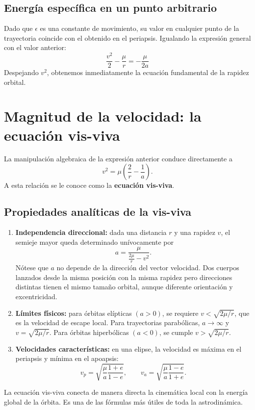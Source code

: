 \subsection{Energía específica en un punto arbitrario}
Dado que \(\epsilon\) es una constante de movimiento, su valor en cualquier punto de la trayectoria coincide con el obtenido en el periapsis. Igualando la expresión general con el valor anterior:
\[
\frac{v^2}{2} - \frac{\mu}{r} = -\frac{\mu}{2a}
\]
Despejando \(v^2\), obtenemos inmediatamente la ecuación fundamental de la rapidez orbital.

\section{Magnitud de la velocidad: la ecuación vis-viva}
La manipulación algebraica de la expresión anterior conduce directamente a
\[
 v^2 = \mu\left(\frac{2}{r} - \frac{1}{a}\right).
\]
A esta relación se le conoce como la \textbf{ecuación vis-viva}.

\subsection{Propiedades analíticas de la vis-viva}
\begin{enumerate}
    \item \textbf{Independencia direccional:} dada una distancia \(r\) y una rapidez \(v\), el semieje mayor queda determinado unívocamente por
\[
 a = \frac{\mu}{\frac{2\mu}{r} - v^2}.
\]
    Nótese que \(a\) no depende de la dirección del vector velocidad. Dos cuerpos lanzados desde la misma posición con la misma rapidez pero direcciones distintas tienen el mismo tamaño orbital, aunque diferente orientación y excentricidad.
    \item \textbf{Límites físicos:} para órbitas elípticas \((a>0)\), se requiere \(v < \sqrt{2\mu/r}\), que es la velocidad de escape local. Para trayectorias parabólicas, \(a \to \infty\) y \(v=\sqrt{2\mu/r}\). Para órbitas hiperbólicas \((a<0)\), se cumple \(v > \sqrt{2\mu/r}\).
    \item \textbf{Velocidades características:} en una elipse, la velocidad es máxima en el periapsis y mínima en el apoapsis:
\[
 v_p = \sqrt{\frac{\mu}{a}\frac{1+e}{1-e}}, \qquad
 v_a = \sqrt{\frac{\mu}{a}\frac{1-e}{1+e}}.
\]
\end{enumerate}

\begin{importante}
La ecuación vis-viva conecta de manera directa la cinemática local con la energía global de la órbita. Es una de las fórmulas más útiles de toda la astrodinámica.
\end{importante}

